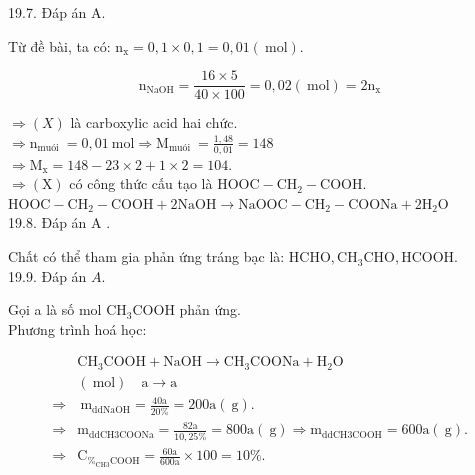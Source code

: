 \documentclass[10pt]{article}
\begin{document}
19.7. Đáp án A.

Từ đề bài, ta có: $\mathrm{n}_{\mathrm{x}}=0,1 \times 0,1=0,01(\mathrm{~mol})$.

$$
\mathrm{n}_{\mathrm{NaOH}}=\frac{16 \times 5}{40 \times 100}=0,02(\mathrm{~mol})=2 \mathrm{n}_{\mathrm{x}}
$$

$\Rightarrow(X)$ là carboxylic acid hai chức.\\
$\Rightarrow \mathrm{n}_{\text {muói }}=0,01 \mathrm{~mol} \Rightarrow \mathrm{M}_{\text {muói }}=\frac{1,48}{0,01}=148$\\
$\Rightarrow \mathrm{M}_{\mathrm{x}}=148-23 \times 2+1 \times 2=104$.\\
$\Rightarrow(\mathrm{X})$ có công thức cấu tạo là $\mathrm{HOOC}-\mathrm{CH}_{2}-\mathrm{COOH}$.\\
$\mathrm{HOOC}-\mathrm{CH}_{2}-\mathrm{COOH}+2 \mathrm{NaOH} \rightarrow \mathrm{NaOOC}-\mathrm{CH}_{2}-\mathrm{COONa}+2 \mathrm{H}_{2} \mathrm{O}$\\
19.8. Đáp án A .

Chất có thể tham gia phản ứng tráng bạc là: $\mathrm{HCHO}, \mathrm{CH}_{3} \mathrm{CHO}, \mathrm{HCOOH}$.\\
19.9. Đáp án $A$.

Gọi a là số mol $\mathrm{CH}_{3} \mathrm{COOH}$ phản ứng.\\
Phương trình hoá học:

$$
\begin{aligned}
& \mathrm{CH}_{3} \mathrm{COOH}+\mathrm{NaOH} \rightarrow \mathrm{CH}_{3} \mathrm{COONa}+\mathrm{H}_{2} \mathrm{O} \\
& (\mathrm{~mol}) \quad \mathrm{a} \rightarrow \mathrm{a} \\
\Rightarrow & \mathrm{~m}_{\mathrm{dd} \mathrm{NaOH}}=\frac{40 \mathrm{a}}{20 \%}=200 \mathrm{a}(\mathrm{~g}) . \\
\Rightarrow & \mathrm{m}_{\mathrm{ddCH} 3 \mathrm{COONa}}=\frac{82 \mathrm{a}}{10,25 \%}=800 \mathrm{a}(\mathrm{~g}) \Rightarrow \mathrm{m}_{\mathrm{dd} \mathrm{CH} 3 \mathrm{COOH}}=600 \mathrm{a}(\mathrm{~g}) . \\
\Rightarrow & \mathrm{C}_{\%_{\mathrm{CH} 3} \mathrm{COOH}}=\frac{60 \mathrm{a}}{600 \mathrm{a}} \times 100=10 \% .
\end{aligned}
$$
\end{document}

